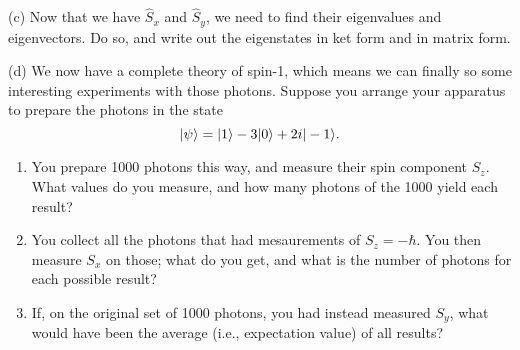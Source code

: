 \begin{problem}[Spin-1]
(c) Now that we have $\hat{S}_x$ and $\hat{S}_y$, we need to find their eigenvalues and eigenvectors.  Do so, and write out the eigenstates in ket form and in matrix form.

(d) We now have a complete theory of spin-1, which means we can finally so some interesting experiments with those photons.  Suppose you arrange your apparatus to prepare the photons in the state
\[
| \psi \rangle = | 1 \rangle - 3| 0 \rangle + 2i| -1 \rangle.
\]
\begin{enumerate}[label=\roman*.	]
\item You prepare 1000 photons this way, and measure their spin component $S_z$.  What values do you measure, and how many photons of the 1000 yield each result?
\item You collect all the photons that had mesaurements of $S_z = -\hbar$.  You then measure $S_x$ on those; what do you get, and what is the number of photons for each possible result?
\item If, on the original set of 1000 photons, you had instead measured $S_y$, what would have been the average (i.e., expectation value) of all results?
\end{enumerate}

\end{problem}



